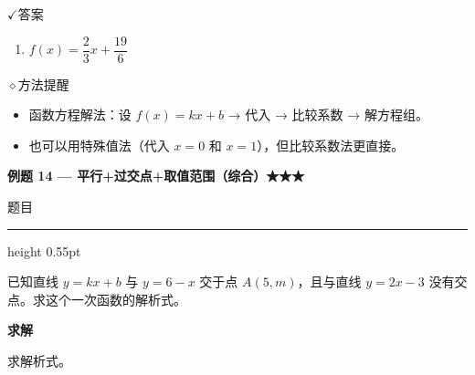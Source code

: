 \documentclass{exam-zh}
\newcommand{\eduSectionTitle}[1]{%
  \needspace{5\baselineskip}%
  \vspace{2mm}
  {\color{edu-blue}\bfseries\large #1}\par
  \vspace{3mm}
}
\newenvironment{eduSubQuestionItem}[1]{%
  \needspace{4\baselineskip}%
  \vspace{2mm}
  \par\noindent
  \hangindent=8mm\hangafter=1
  {\color{edu-blue}\bfseries #1}\enspace
  \begingroup
  \color{edu-ink}
}{%
  \endgroup
  \par
  \vspace{3mm}
}
\newcommand{\eduIconCheck}{\(\checkmark\)}
\newcommand{\eduIconPin}{\(\diamond\)}
\newenvironment{eduProblemBlock}[1][题目]{%
  \needspace{8\baselineskip}
  {\small\color{edu-muted}#1}\par
  \vspace{1.5mm}
  {\color{edu-blue}\hrule height 0.55pt}
  \vspace{4.5mm}
  \begingroup
  \color{edu-ink}
  \large
  \setlength{\parskip}{2.2mm}
  \linespread{1.20}\selectfont
}{%
  \par
  \endgroup
  \vspace{6mm}
}
\newenvironment{eduBulletList}{%
  \begin{itemize}[
    label=\textbullet,
    leftmargin=5mm,
    itemsep=1.2mm,
    topsep=0pt,
    parsep=0pt
  ]
}{%
  \end{itemize}
}
\newenvironment{eduBottomGrid}{%
  \vspace{1mm}
  \par\noindent
}{%
  \par\vspace{1mm}
}
\newenvironment{eduSummaryLeft}{%
  \begin{minipage}[t]{0.30\linewidth}
}{%
  \end{minipage}
}
\newcommand{\eduSummaryDivider}{%
  \hspace{4mm}{\color{edu-line}\vrule width 0.35pt}\hspace{7mm}%
}
\newenvironment{eduSummaryRight}{%
  \begin{minipage}[t]{0.58\linewidth}
}{%
  \end{minipage}
}
\newenvironment{eduPlainList}{%
  \begin{enumerate}[
    label=(\arabic*),
    leftmargin=7mm,
    itemsep=1.2mm,
    topsep=0pt,
    parsep=0pt
  ]
}{%
  \end{enumerate}
}
\begin{document}
\begin{eduBottomGrid}
  \begin{eduSummaryLeft}
    \begin{eduSummaryBlock}{\eduIconCheck}{答案}
    \begin{eduPlainList}
      \item $f(x) = \dfrac{2}{3}x + \dfrac{19}{6}$    \end{eduPlainList}
    \end{eduSummaryBlock}
  \end{eduSummaryLeft}
  \eduSummaryDivider
  \begin{eduSummaryRight}
    \begin{eduSummaryBlock}{\eduIconPin}{方法提醒}
    \begin{eduBulletList}
      \item 函数方程解法：设 $f(x) = kx + b$ → 代入 → 比较系数 → 解方程组。      \item 也可以用特殊值法（代入 $x = 0$ 和 $x = 1$），但比较系数法更直接。    \end{eduBulletList}
    \end{eduSummaryBlock}
  \end{eduSummaryRight}
\end{eduBottomGrid}



\eduSectionTitle{例题 14 — 平行+过交点+取值范围（综合）★★★}

\begin{eduProblemBlock}[题目]
已知直线 $y = kx + b$ 与 $y = 6 - x$ 交于点 $A(5, m)$，且与直线 $y = 2x - 3$ 没有交点。求这个一次函数的解析式。
\end{eduProblemBlock}





\begin{eduSubQuestionItem}{求解}
求解析式。\end{eduSubQuestionItem}
\end{document}
